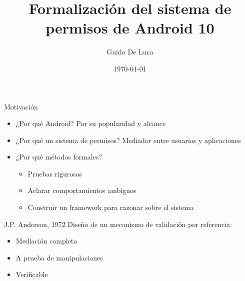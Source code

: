 \documentclass[pdf, handout]{beamer} %
\title{Formalización del sistema de permisos de Android 10}
\author[Universidad Nacional de Rosario]{Guido De Luca}
\institute{Universidad Nacional de Rosario}
\date{\today}
\begin{document}


\begin{frame}[plain]
    \titlepage
\end{frame}

\begin{frame}{Motivación}
    \begin{itemize}
        \item ¿Por qué Android? \pause Por su popularidad y alcance \pause
        \item ¿Por qué un sistema de permisos? \pause Mediador entre usuarios y aplicaciones \pause
        \item ¿Por qué métodos formales? \pause
              \begin{itemize}[<+->]
                  \item Pruebas rigurosas
                  \item Aclarar comportamientos ambiguos
                  \item Construir un framework para razonar sobre el sistema
              \end{itemize}
    \end{itemize}
\end{frame}

\begin{frame}{J.P. Anderson, 1972}
    Diseño de un mecanismo de validación por referencia:
    \pause
    \begin{itemize}[<+->]
        \item Mediación completa
        \item A prueba de manipulaciones
        \item Verificable
    \end{itemize}
\end{frame}
\end{document}
